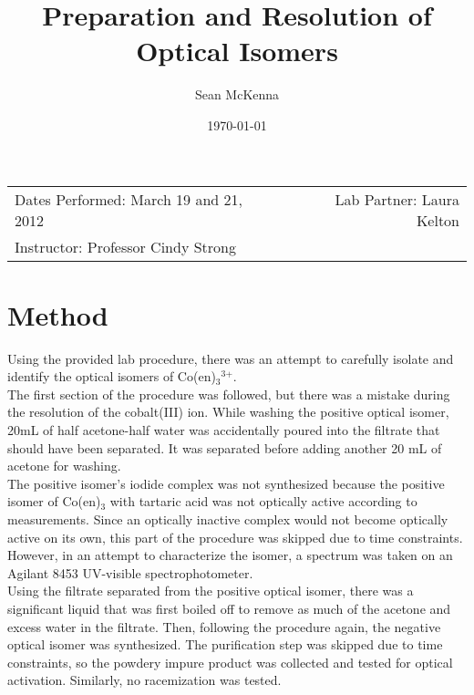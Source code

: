 \documentclass[11pt]{article}
\title{Preparation and Resolution of Optical Isomers}
\author{Sean McKenna}
\date{\today}
\newcommand{\super}[1]{\ensuremath{^{\textrm{#1}}}}
\newcommand{\sub}[1]{\ensuremath{_{\textrm{#1}}}}
\begin{document}
\maketitle

\begin{center}
\begin{tabular}{lr}
Dates Performed: March 19 and 21, 2012 & Lab Partner: Laura Kelton \\
Instructor: Professor Cindy Strong
\end{tabular}
\end{center}


\section{Method}
Using the provided lab procedure,\cite{lab} there was an attempt to carefully isolate and identify the optical isomers of Co(en)\sub{3}\super{3+}. \\

The first section of the procedure was followed, but there was a mistake during the resolution of the cobalt(III) ion. While washing the positive optical isomer, 20mL of half acetone-half water was accidentally poured into the filtrate that should have been separated. It was separated before adding another 20 mL of acetone for washing. \\

The positive isomer's iodide complex was not synthesized because the positive isomer of Co(en)\sub{3} with tartaric acid was not optically active according to measurements. Since an optically inactive complex would not become optically active on its own, this part of the procedure was skipped due to time constraints. However, in an attempt to characterize the isomer, a spectrum was taken on an Agilant 8453 UV-visible spectrophotometer. \\

Using the filtrate separated from the positive optical isomer, there was a significant liquid that was first boiled off to remove as much of the acetone and excess water in the filtrate. Then, following the procedure again, the negative optical isomer was synthesized. The purification step was skipped due to time constraints, so the powdery impure product was collected and tested for optical activation. Similarly, no racemization was tested.


\end{document}
